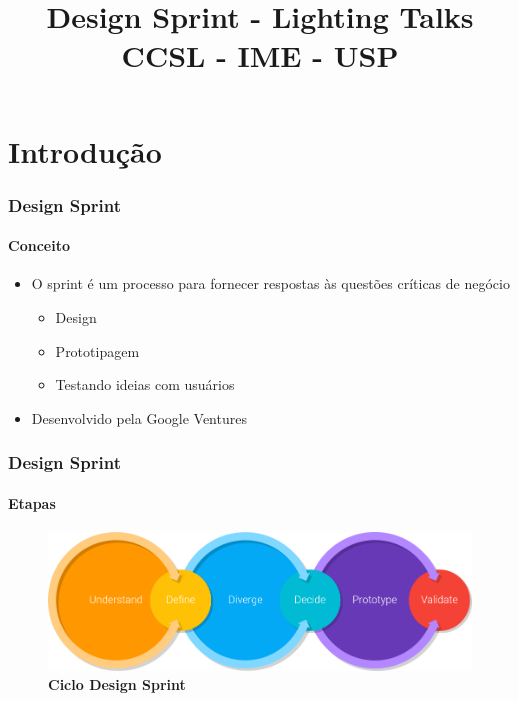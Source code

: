 \documentclass{beamer}
\title{
  \textbf{Design Sprint - Lighting Talks} \\
  CCSL - IME - USP
}
\begin{document}
\maketitle

\section{Introdução}

\begin{frame}
  \frametitle{Design Sprint}
  \framesubtitle{Conceito}

  \begin{itemize}
    \item O sprint é um processo para fornecer respostas às questões críticas de negócio
      \begin{itemize}
        \item Design
          \vspace{.25cm}
        \item Prototipagem
          \vspace{.25cm}
        \item Testando ideias com usuários
      \end{itemize}
      \vspace{.5cm}
    \item Desenvolvido pela Google Ventures
  \end{itemize}
\end{frame}

\begin{frame}
  \frametitle{Design Sprint}
  \framesubtitle{Etapas}
  \begin{figure}
    \begin{center}
      \includegraphics[width=\textwidth]{home-DS-flow-ill.png}\\
      \textbf{Ciclo Design Sprint}
    \end{center}
  \end{figure}
\end{frame}
\end{document}

